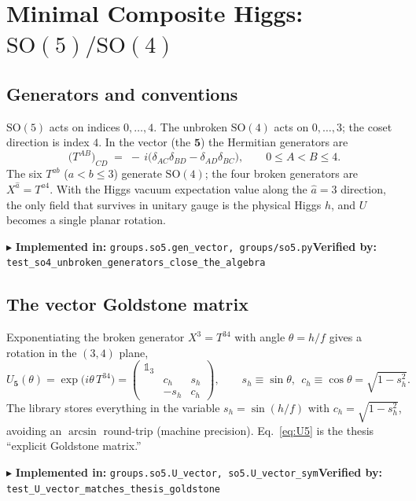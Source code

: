 \documentclass[11pt]{article}
\newcommand{\SO}[1]{\mathrm{SO}(#1)}
\newcommand{\sh}{s_h}
\newcommand{\ch}{c_h}
\newcommand{\code}[1]{\texttt{#1}}
\newcommand{\impl}[2]{\par\smallskip\noindent\textcolor{blue!60!black}{\small$\blacktriangleright$ \textbf{Implemented in:} \code{#1}\quad\textbf{Verified by:} \code{#2}}\par\smallskip}
\begin{document}
\section{Minimal Composite Higgs: \texorpdfstring{$\SO5/\SO4$}{SO(5)/SO(4)}}

\subsection{Generators and conventions}
$\SO5$ acts on indices $0,\dots,4$. The unbroken $\SO4$ acts on $0,\dots,3$; the coset direction
is index $4$. In the vector (the $\mathbf 5$) the Hermitian generators are
\begin{equation}
  \big(T^{AB}\big)_{CD} \;=\; -\,i\big(\delta_{AC}\delta_{BD}-\delta_{AD}\delta_{BC}\big),
  \qquad 0\le A<B\le 4 .
\end{equation}
The six $T^{ab}$ ($a<b\le 3$) generate $\SO4$; the four broken generators are $X^{\hat a}=T^{\hat a 4}$.
With the Higgs vacuum expectation value along the $\hat a=3$ direction, the only field that survives
in unitary gauge is the physical Higgs $h$, and $U$ becomes a single planar rotation.
\impl{groups.so5.gen\_vector, groups/so5.py}{test\_so4\_unbroken\_generators\_close\_the\_algebra}

\subsection{The vector Goldstone matrix}
Exponentiating the broken generator $X^3=T^{34}$ with angle $\theta=h/f$ gives a rotation in the
$(3,4)$ plane,
\begin{equation}
  U_{\mathbf 5}(\theta)=\exp\!\big(i\theta\,T^{34}\big)
  =\begin{pmatrix} \mathbb 1_3 & & \\ & \ch & \sh \\ & -\sh & \ch \end{pmatrix},
  \qquad \sh\equiv\sin\theta,\ \ \ch\equiv\cos\theta=\sqrt{1-\sh^2}.
  \label{eq:U5}
\end{equation}
The library stores everything in the variable $\sh=\sin(h/f)$ with $\ch=\sqrt{1-\sh^2}$, avoiding
an $\arcsin$ round-trip (machine precision). Eq.~\eqref{eq:U5} is the thesis ``explicit Goldstone
matrix.''
\impl{groups.so5.U\_vector, so5.U\_vector\_sym}{test\_U\_vector\_matches\_thesis\_goldstone}
\end{document}
